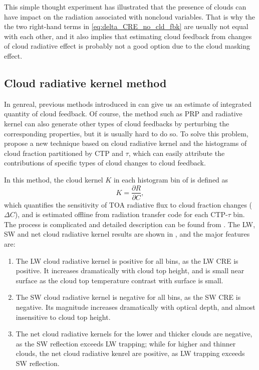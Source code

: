 This simple thought experiment has illustrated that the presence of clouds can have impact on the radiation associated with noncloud variables. That is why the the two right-hand terms in \eqref{eq:delta_CRE_no_cld_fbk} are usually not equal with each other, and it also implies that estimating cloud feedback from changes of cloud radiative effect is probably not a good option due to the cloud masking effect.

\subsection{Cloud radiative kernel method}
\label{sec:Zelinka_method}
In genreal, previous methods introduced in  can give us an estimate of integrated quantity of cloud feedback. Of course, the method such as PRP and radiative kernel can also generate other types of cloud feedbacks by perturbing the corresponding properties, but it is usually hard to do so. To solve this problem, \cite{Zelinka2012computing1,Zelinka2012computing2} propose a new technique based on cloud radiative kernel and the histograms of cloud fraction partitioned by CTP and $\tau$, which can easily attribute the contributions of specific types of cloud changes to cloud feedback.

In this method, the cloud kernel $K$ in each histogram bin of  is defined as
\begin{equation}
    K = \frac{\partial R}{\partial C},
\end{equation}
which quantifies the sensitivity of TOA radiative flux to cloud fraction changes ($\Delta C$), and is estimated offline from radiation transfer code for each CTP-$\tau$ bin. The process is complicated and detailed description can be found from \cite{Zelinka2012computing1}. The LW, SW and net cloud radiative kernel results are shown in , and the major features are:
\begin{enumerate}
    \item The LW cloud radiative kernel is positive for all bins, as the LW CRE is positive. It increases dramatically with cloud top height, and is small near surface as the cloud top temperature contrast with surface is small.
    \item The SW cloud radiative kernel is negative for all bins, as the SW CRE is negative. Its magnitude increases dramatically with optical depth, and almost insensitive to cloud top height.
    \item The net cloud radiative kernels for the lower and thicker clouds are negative, as the SW reflection exceeds LW trapping; while for higher and thinner clouds, the net cloud radiative kenrel are positive, as LW trapping exceeds SW reflection.
\end{enumerate}

